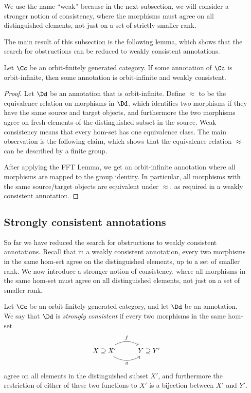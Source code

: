 We use the name ``weak'' because in the  next subsection, we  will consider a stronger notion of consistency, where the morphisms must agree on all distinguished elements, not just on a set of strictly smaller rank. 

The main result of this subsection is the following lemma, which shows that the search for obstructions can be reduced to weakly consistent annotations.
\begin{lemma}\label{lem:complete-annotation-exists-weakly-consistent}
    Let $\Cc$ be an orbit-finitely generated category.
    If some  annotation of $\Cc$ is orbit-infinite, then some  annotation is orbit-infinite and weakly consistent.
\end{lemma}

\begin{proof}
    Let $\Dd$ be an annotation that is orbit-infinite. Define $\approx$ to be the equivalence relation on morphisms in $\Dd$, which identifies two morphisms if they have the same 
    source and target objects,  and  furthermore the two morphisms agree on fresh elements of the distinguished subset in the source. Weak consistency means that every hom-set has one equivalence class.  The main observation is the following claim, which shows that the equivalence relation $\approx$ can be described by a finite group. 

    After applying the FFT Lemma, we get an orbit-infinite annotation where all morphisms are mapped to the group identity. In particular, all morphisms with the same source/target objects are equivalent under $\approx$, as required in a weakly consistent annotation.
\end{proof}

\subsection{Strongly consistent annotations}
\label{sec:strongly-consistent-annotations}
So far we have reduced the search for obstructions to weakly consistent annotations. Recall that in a weakly consistent annotation, every two morphisms in the same hom-set agree on the distinguished elements, up to a set of smaller rank. We now introduce a stronger notion of consistency, where all morphisms in the same hom-set must agree on all distinguished elements, not just on a set of smaller rank. 


\begin{definition}
    \label{def:strong-consistency}
    Let $\Cc$ be an orbit-finitely generated category, and let $\Dd$ be an annotation. We say that $\Dd$ is \emph{strongly consistent} if every two morphisms in the same hom-set 
    \[
    \begin{tikzcd}
    X \supseteq X' \ar[r, bend left, "f"]
    \ar[r, bend right, "g"'] & Y \supseteq Y'
    \end{tikzcd}
    \]
    agree on all elements in the distinguished subset $X'$, and furthermore the restriction of either of these two functions to $X'$ is a bijection between $X'$ and $Y'$. 
\end{definition}



